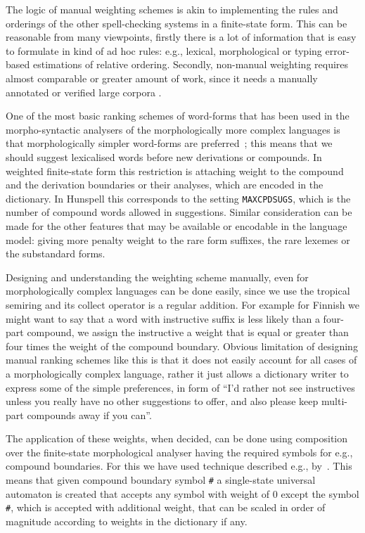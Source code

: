 \documentclass[a4paper,12pt]{article}
\begin{document}
The logic of manual weighting schemes is akin to implementing the rules and
orderings of the other spell-checking systems in a finite-state form. This can
be reasonable from many viewpoints, firstly there is a lot of information that
is easy to formulate in kind of ad hoc rules: e.g., lexical, morphological or
typing error-based estimations of relative ordering. Secondly, non-manual
weighting requires almost comparable or greater amount of work, since it needs
a manually annotated or verified large corpora .

One of the most basic ranking schemes of word-forms that has been used in the
morpho-syntactic analysers of the morphologically more complex languages is
that morphologically simpler word-forms are
preferred~\cite[]{karlsson1992swetwol}; this means that we should suggest
lexicalised words before new derivations or compounds.  In weighted
finite-state form this restriction is attaching weight to the compound and the
derivation boundaries or their analyses, which are encoded in the dictionary.
In Hunspell this corresponds to the setting \texttt{MAXCPDSUGS}, which is
the number of compound words allowed in suggestions. Similar
consideration can be made for the other features that may be available or
encodable in the language model: giving more penalty weight to the rare form
suffixes, the rare lexemes or the substandard forms.

Designing and understanding the weighting scheme manually, even for
morphologically complex languages can be done easily, since we use the tropical
semiring and its collect operator is a regular addition. For example for
Finnish we might want to say that a word with instructive suffix is less likely
than a four-part compound, we assign the instructive a weight that is equal or
greater than four times the weight of the compound boundary. Obvious limitation
of designing manual ranking schemes like this is that it  does not easily
account for all cases of a morphologically complex language, rather it just
allows a dictionary writer to express some of the simple preferences, in form
of ``I'd rather not see instructives unless you really have no other
suggestions to offer, and also please keep multi-part compounds away if you
can''.

The application of these weights, when decided, can be done using composition
over the finite-state morphological analyser having the required symbols for
e.g., compound boundaries. For this we have used technique described e.g.,
by~\cite{linden/2009/fsmnlp}. This means that given compound boundary symbol
\texttt{\#} a single-state universal automaton is created that accepts any
symbol with weight of $0$ except the symbol \texttt{\#}, which is accepted with
additional weight, that can be scaled in order of magnitude according to
weights in the dictionary if any.
\end{document}
